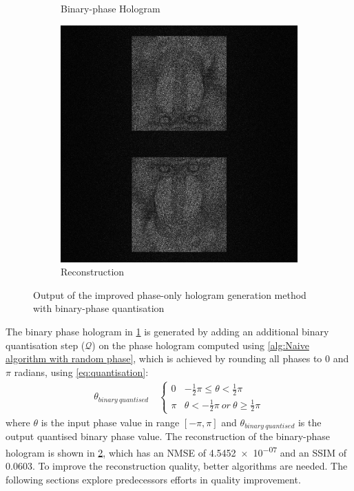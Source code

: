 \begin{figure}[H]
\begin{subfigure}[t]{0.3\textwidth}
    \caption{Binary-phase Hologram}
    \label{fig:Naive_binary_Holo}
  \end{subfigure}
  \hfill
  \begin{subfigure}[t]{0.3\textwidth}
    \centering
    \includegraphics[width=\textwidth]{Naive_binary_Recon.jpg}
    \caption{Reconstruction}
    \label{fig:Naive_binary_Recon}
  \end{subfigure}
  \caption{Output of the improved phase-only hologram generation method with binary-phase quantisation}
  \label{fig:Output of the improved Naive method with binary-phase quantisation}
\end{figure}

The binary phase hologram in \cref{fig:Naive_binary_Holo} is generated by adding an additional binary quantisation step ($\mathcal{Q}$) on the phase hologram computed using \cref{alg:Naive algorithm with random phase}, which is achieved by rounding all phases to 0 and $\pi$ radians, using \cref{eq:quantisation}:
\begin{align}
  \theta_{binary\ quantised}   & \                       \left\{
  \begin{array}{ll}
    0 & -\frac{1}{2} \pi \leqslant \theta < \frac{1}{2} \pi          \\
    \pi & \theta < -\frac{1}{2} \pi \ or\ \theta \geqslant  \frac{1}{2} \pi
  \end{array}
  \right.
  \label{eq:quantisation}
\end{align}
where $\theta$ is the input phase value in range $[-\pi, \pi]$ and $\theta_{binary\ quantised}$ is the output quantised binary phase value. The reconstruction of the binary-phase hologram is shown in \cref{fig:Naive_binary_Recon}, which has an NMSE of \num{4.5452e-07} and an SSIM of 0.0603. To improve the reconstruction quality, better algorithms are needed. The following sections explore predecessors efforts in quality improvement.

